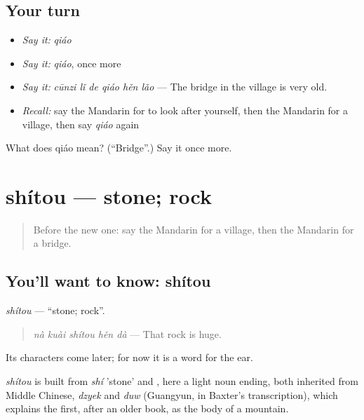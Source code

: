 \subsection*{Your turn}
\begin{itemize}
\raggedright
  \item \emph{Say it:} \emph{qiáo}
  \item \emph{Say it:} \emph{qiáo}, once more
  \item \emph{Say it:} \emph{cūnzi lǐ de qiáo hěn lǎo} — The bridge in the village is very old.
  \item \emph{Recall:} say the Mandarin for to look after yourself, then the Mandarin for a village, then say \emph{qiáo} again
\end{itemize}

\begin{tcolorbox}[breakable,colback=teal!4,colframe=teal!35!black,title={Before you move on}]
What does qiáo mean? (\textquotedblleft{}Bridge\textquotedblright{}.) Say it once more.
\end{tcolorbox}
\section[shítou]{shítou — stone; rock}

\label{lesson:ZH-C246-shitou}



\begin{quote}
Before the new one: say the Mandarin for a village, then the Mandarin for a bridge.
\end{quote}

\subsection*{You'll want to know: shítou}
\emph{shítou} — \textquotedblleft{}stone; rock\textquotedblright{}.

\begin{quote}
\emph{nà kuài shítou hěn dà} — That rock is huge.
\end{quote}

Its characters come later; for now it is a word for the ear.

\begin{cousinweb}
\emph{shítou} is built from \emph{shí} 'stone' and , here a light noun ending, both inherited from Middle Chinese, \emph{dzyek} and \emph{duw} (Guangyun, in Baxter's transcription), which explains the first, after an older book, as the body of a mountain.
\end{cousinweb}

